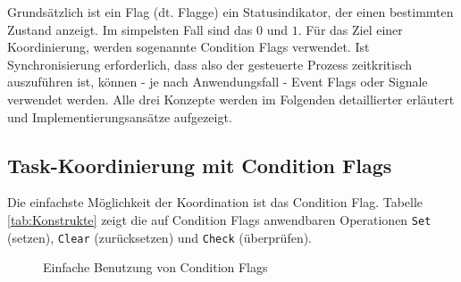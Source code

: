\documentclass{llncs}
\begin{document}
\begin{table}
	\centering %
	\def\arraystretch{1.5} %
	\setlength{\tabcolsep}{0.5em} %
	\caption{\label{tab:Konstrukte} Koordinierungs- und Synchronisationskonstrukte \autocite[vgl.][82]{Cooling2017}}
\end{table}
Grundsätzlich ist ein Flag (dt. Flagge) ein Statusindikator, der einen bestimmten Zustand anzeigt. Im simpelsten Fall sind das $0$ und $1$. Für das Ziel einer Koordinierung, werden sogenannte Condition Flags verwendet. Ist Synchronisierung erforderlich, dass also der gesteuerte Prozess zeitkritisch auszuführen ist, können - je nach Anwendungsfall - Event Flags oder Signale verwendet werden. Alle drei Konzepte werden im Folgenden detaillierter erläutert und Implementierungsansätze aufgezeigt.

\subsection{Task-Koordinierung mit Condition Flags}
\label{subsec:Koordinierung_mit_Condition_Flags}
Die einfachste Möglichkeit der Koordination ist das Condition Flag. Tabelle \ref{tab:Konstrukte} zeigt die auf Condition Flags anwendbaren Operationen \texttt{Set} (setzen), \texttt{Clear} (zurücksetzen) und \texttt{Check} (überprüfen).

\begin{figure}[h]
\centering
\def\svgwidth{300pt}

\caption{\label{fig:ConditionFlag} Einfache Benutzung von Condition Flags \autocite[vgl.][83]{Cooling2017}}
\end{figure}
\end{document}
